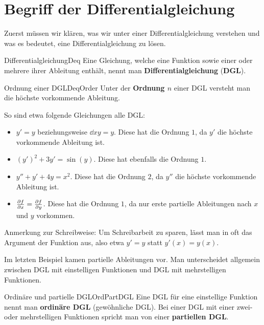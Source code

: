 \section{Begriff der Differentialgleichung}

Zuerst müssen wir klären, was wir unter einer Differentialgleichung verstehen und was es bedeutet, eine Differentialgleichung zu lösen.

\begin{definition}{Differentialgleichung}{Deq}
    Eine Gleichung, welche eine Funktion sowie einer oder mehrere ihrer Ableitung enthält, nennt man \textbf{Differentialgleichung} (\textbf{DGL}).
\end{definition}

\begin{definition}{Ordnung einer DGL}{DeqOrder}
    Unter der \textbf{Ordnung $n$} einer DGL versteht man die höchste vorkommende Ableitung.
\end{definition}

So sind etwa folgende Gleichungen alle DGL:

\begin{itemize}
    \item $y' = y$ beziehungsweise $\dd{}{x} y = y$. Diese hat die Ordnung $1$, da $y'$ die höchste vorkommende Ableitung ist.
    \item $(y')^2 + 3 y' = \sin(y)$. Diese hat ebenfalls die Ordnung $1$.
    \item $y''+y'+4y=x^2$. Diese hat die Ordnung $2$, da $y''$ die höchste vorkommende Ableitung ist.
    \item $\frac{\partial f}{\partial x} = \frac{\partial f}{\partial y}$. Diese hat die Ordnung $1$, da nur erste partielle Ableitungen nach $x$ und $y$ vorkommen.
\end{itemize}

Anmerkung zur Schreibweise: Um Schreibarbeit zu sparen, lässt man in oft das Argument der Funktion aus, also etwa $y'=y$ statt $y'(x) = y(x)$.

Im letzten Beispiel kamen partielle Ableitungen vor. Man unterscheidet allgemein zwischen DGL mit einstelligen Funktionen und DGL mit mehrstelligen Funktionen.

\begin{definition}{Ordinäre und partielle DGL}{OrdPartDGL}
    Eine DGL für eine einstellige Funktion nennt man \textbf{ordinäre DGL} (gewöhnliche DGL). Bei einer DGL mit einer zwei- oder mehrstelligen Funktionen spricht man von einer \textbf{partiellen DGL}.
\end{definition}

